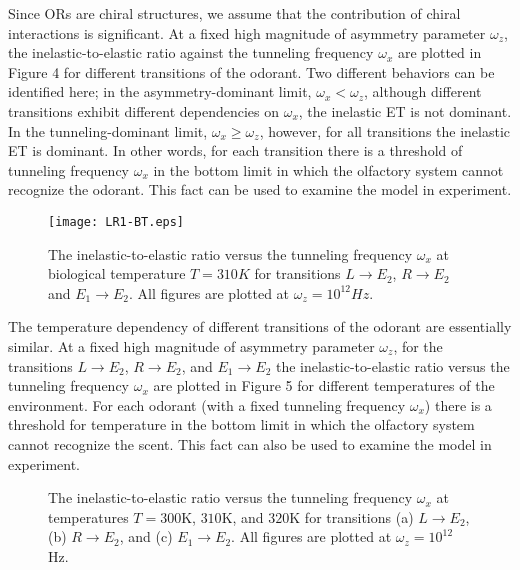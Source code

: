 \documentclass[aps,prl,tightenlines,onecolumn,superscriptaddress]{revtex4}
\begin{document}
\noindent Since ORs are chiral structures, we assume that the contribution of chiral interactions is significant. At a fixed high magnitude of asymmetry parameter $\omega_{z}$, the inelastic-to-elastic ratio against the tunneling frequency $\omega_{x}$ are plotted in Figure 4 for different transitions of the odorant. Two different behaviors can be identified here; in the asymmetry-dominant limit, $\omega_{x}<\omega_{z}$, although different transitions exhibit different dependencies on $\omega_{x}$, the inelastic ET is not dominant. In the tunneling-dominant limit, $\omega_{x}\geq\omega_{z}$, however, for all transitions the inelastic ET is dominant. In other words, for each transition there is a threshold of tunneling frequency $\omega_{x}$ in the bottom limit in which the olfactory system cannot recognize the odorant. This fact can be used to examine the model in experiment.

\begin{figure}
\texttt{[image: LR1-BT.eps]}\centering
\caption{The inelastic-to-elastic ratio versus the tunneling frequency $\omega_{x}$ at biological temperature $T=310K$ for transitions $L\rightarrow E_{2}$, $R\rightarrow E_{2}$ and $E_{1}\rightarrow E_{2}$. All figures are plotted at $\omega_{z}=10^{12}Hz$.}
\end{figure}

 The temperature dependency of different transitions of the odorant are essentially similar. At a fixed high magnitude of asymmetry parameter $\omega_{z}$, for the transitions $L\rightarrow E_{2}$, $R\rightarrow E_{2}$, and $E_{1}\rightarrow E_{2}$ the inelastic-to-elastic ratio versus the tunneling frequency $\omega_{x}$ are plotted in Figure 5 for different temperatures of the environment. For each odorant (with a fixed tunneling frequency $\omega_{x}$) there is a threshold for temperature in the bottom limit in which the olfactory system cannot recognize the scent. This fact can also be used to examine the model in experiment.

\begin{figure}[H]
\centering
{}\centering
{}\centering
\caption{The inelastic-to-elastic ratio versus the tunneling frequency $\omega_{x}$ at temperatures $T=300$K, $310$K, and $320$K for transitions (a) $L\rightarrow E_{2}$, (b) $R\rightarrow E_{2}$, and (c) $E_{1}\rightarrow E_{2}$. All figures are plotted at $\omega_{z}=10^{12}$Hz.}
\end{figure}
\end{document}
